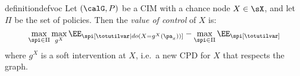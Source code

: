 








\begin{restatable}{definition}{defvoc}
Let $(\calG, P)$ be a CIM with a chance node $X \in \sX$,
and let $\Pi$ be the set of policies.
Then the \emph{value of control} of $X$ is:
    \[
    \max_{\spi \in \Pi}\max_{g^X} \EE_\spi[\totutilvar|do(X=g^X(\pa_x))]
    -
    \max_{\spi \in \Pi} \EE_\spi[\totutilvar]
\]
where $g^X$ is a soft intervention at $X$, i.e.\ a new CPD for $X$ that respects the graph.
\end{restatable}